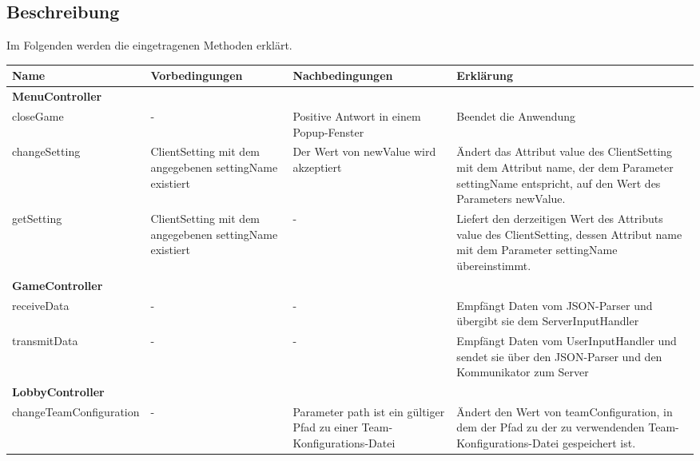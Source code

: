 \subsection{Beschreibung}
	Im Folgenden werden die eingetragenen Methoden erklärt.
\begin{center}
	\begin{tabular}{|p{4.7cm}|p{3.5cm}|p{3.5cm}|p{4.3cm}|}
		\hline
		\textbf{Name} & \textbf{Vorbedingungen} & \textbf{Nachbedingungen} & \textbf{Erklärung}\\\hline
		\multicolumn{4}{|l|}{\textbf{MenuController}} \\\hline
		closeGame & - & Positive Antwort in einem Popup-Fenster & Beendet die Anwendung\\\hline
		changeSetting & ClientSetting mit dem angegebenen settingName existiert & Der Wert von newValue wird akzeptiert & Ändert das Attribut value des ClientSetting mit dem Attribut name, der dem Parameter settingName entspricht, auf den Wert des Parameters newValue.\\\hline
		getSetting& ClientSetting mit dem angegebenen settingName existiert & - & Liefert den derzeitigen Wert des Attributs value des ClientSetting, dessen Attribut name mit dem Parameter settingName übereinstimmt.\\\hline
		\multicolumn{4}{|l|}{\textbf{GameController}} \\\hline
		receiveData & - & - & Empfängt Daten vom JSON-Parser und übergibt sie dem ServerInputHandler\\\hline
		transmitData & - & - & Empfängt Daten vom UserInputHandler und sendet sie über den JSON-Parser und den Kommunikator zum Server\\\hline
		\multicolumn{4}{|l|}{\textbf{LobbyController}} \\\hline
		changeTeamConfiguration & - & Parameter path ist ein gültiger Pfad zu einer Team-Konfigurations-Datei & Ändert den Wert von teamConfiguration, in dem der Pfad zu der zu verwendenden Team-Konfigurations-Datei gespeichert ist.\\\hline
		
	\end{tabular}
	

\end{center}
